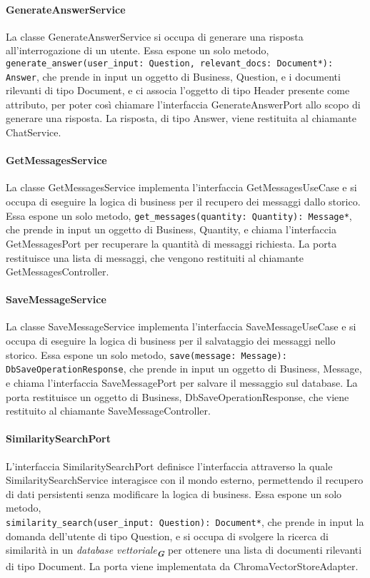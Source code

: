 \paragraph{GenerateAnswerService}
\label{sec:generate_answer_service}
La classe GenerateAnswerService si occupa di generare una risposta all'interrogazione di un utente. Essa espone un solo metodo, \texttt{generate\_answer(user\_input: Question, relevant\_docs: Document*): Answer}, che prende in input un oggetto di Business, Question, e i documenti rilevanti di tipo Document, e ci associa l'oggetto di tipo Header presente come attributo, per poter così chiamare l'interfaccia GenerateAnswerPort allo scopo di generare una risposta. La risposta, di tipo Answer, viene restituita al chiamante ChatService. 

\paragraph{GetMessagesService}
\label{sec:get_messages_service}
La classe GetMessagesService implementa l'interfaccia GetMessagesUseCase e si occupa di eseguire la logica di business per il recupero dei messaggi dallo storico. Essa espone un solo metodo, \texttt{get\_messages(quantity: Quantity): Message*}, che prende in input un oggetto di Business, Quantity, e chiama l'interfaccia GetMessagesPort per recuperare la quantità di messaggi richiesta. La porta restituisce una lista di messaggi, che vengono restituiti al chiamante GetMessagesController.

\paragraph{SaveMessageService}
\label{sec:save_message_service}
La classe SaveMessageService implementa l'interfaccia SaveMessageUseCase e si occupa di eseguire la logica di business per il salvataggio dei messaggi nello storico. Essa espone un solo metodo, \texttt{save(message: Message): DbSaveOperationResponse}, che prende in input un oggetto di Business, Message, e chiama l'interfaccia SaveMessagePort per salvare il messaggio sul database. La porta restituisce un oggetto di Business, DbSaveOperationResponse, che viene restituito al chiamante SaveMessageController.


\label{sec:port}

\paragraph{SimilaritySearchPort}
\label{sec:similarity_search_port}
L'interfaccia SimilaritySearchPort definisce l'interfaccia attraverso la quale SimilaritySearchService interagisce con il mondo esterno, permettendo il recupero di dati persistenti senza modificare la logica di business. Essa espone un solo metodo,\\ \texttt{similarity\_search(user\_input: Question): Document*}, che prende in input la domanda dell'utente di tipo Question, e si occupa di svolgere la ricerca di similarità in un \emph{database vettoriale}\textsubscript{\textbf{\textit{G}}} per ottenere una lista di documenti rilevanti di tipo Document. La porta viene implementata da ChromaVectorStoreAdapter.

